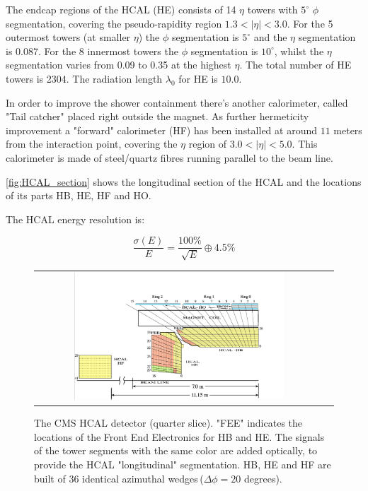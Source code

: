 The endcap regions of the HCAL (HE) consists of 14 $\eta$ towers with $5^{\circ}$ $\phi$ segmentation, covering the pseudo-rapidity region $1.3 < |\eta| < 3.0$. For the 5 outermost towers (at smaller $\eta$) the $\phi$ segmentation is $5^{\circ}$ and the $\eta$ segmentation is 0.087. For the 8 innermost towers the $\phi$ segmentation is $10^{\circ}$, whilst the $\eta$ segmentation varies from 0.09 to 0.35 at the highest $\eta$. The total number of HE towers is 2304. The radiation length $\lambda_{0}$ for HE is $10.0$.

In order to improve the shower containment there's another calorimeter, called "Tail catcher" placed right outside the magnet. As further hermeticity improvement a "forward" calorimeter (HF) has been installed at around $11$ meters from the interaction point, covering the $\eta$ region of $3.0 < |\eta| <5.0$. This calorimeter is made of steel/quartz fibres running parallel to the beam line.

\autoref{fig:HCAL_section} shows the longitudinal section of the HCAL and the locations of its parts HB, HE, HF and HO.

The HCAL energy resolution is:

\begin{equation}
\dfrac{\sigma(E)}{E} = \dfrac{100\%}{\sqrt{E}}\oplus 4.5\%
\end{equation}

\begin{figure}[tbh!]
	\centering
	\begin{tabular}{cc}
		\includegraphics[width=0.75\textwidth]{detector/pics/HCAL_section.png}
	\end{tabular}
	\caption{The CMS HCAL detector (quarter slice). "FEE" indicates the locations of the Front End Electronics for HB and HE. The signals of the tower segments with the same color are added optically, to provide the HCAL "longitudinal" segmentation. HB, HE and HF are built of 36 identical azimuthal wedges\,($\Delta\phi = 20$ degrees).}
	\label{fig:HCAL_section}
\end{figure}

